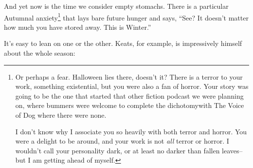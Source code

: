 \documentclass[12pt,oneside]{memoir}
\begin{document}
And yet now is the time we consider empty stomachs. There is a particular Autumnal anxiety\footnote{Or perhaps a fear. Halloween lies there, doesn't it? There is a terror to your work, something existential, but you were also a fan of horror. Your story was going to be the one that started that other fiction podcast we were planning on, where bummers were welcome to complete the dichotomy\footnotemark with The Voice of Dog where there were none.\par
I don't know why I associate you so heavily with both terror and horror. You were a delight to be around, and your work is not \emph{all} terror or horror. I wouldn't call your personality dark, or at least no darker than fallen leaves-- but I am getting ahead of myself.}
 that lays bare future hunger and says, ``See? It doesn't matter how much you have stored away. This is Winter.''

It's easy to lean on one or the other. Keats, for example, is impressively himself about the whole season:
\end{document}
